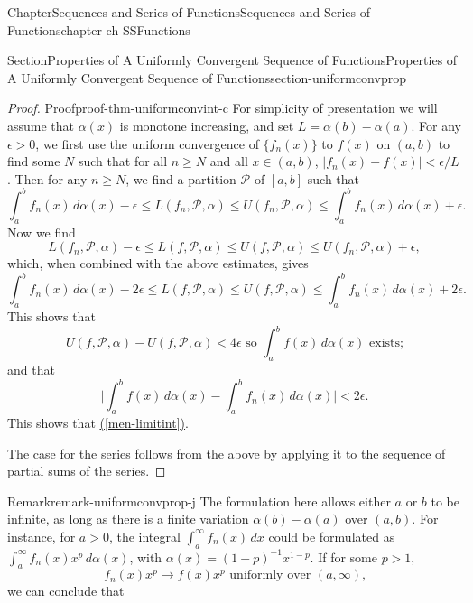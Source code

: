\documentclass[oneside,10pt,]{book}
\newcommand{\xreffont}{\relax}
\numberwithin{equation}{section}
\newcommand{\cP}{\mathcal{P}}
\newcommand{\lt}{<}
\newcommand{\gt}{>}
\begin{document}
\begin{chapterptx}{Chapter}{Sequences and Series of Functions}{}{Sequences and Series of Functions}{}{}{chapter-ch-SSFunctions}
\begin{sectionptx}{Section}{Properties of A Uniformly Convergent Sequence of Functions}{}{Properties of A Uniformly Convergent Sequence of Functions}{}{}{section-uniformconvprop}
\begin{proof}{Proof}{}{proof-thm-uniformconvint-c}
For simplicity of presentation we will assume that \(\alpha(x)\) is monotone increasing, and set \(L=\alpha(b)-\alpha(a)\). For any \(\epsilon \gt 0\), we first use the uniform convergence  of \(\{f_n(x)\}\) to \(f(x)\) on \((a, b)\) to find some \(N\) such that for all \(n\ge N\) and all \(x\in (a, b)\), \(\vert f_n(x)-f(x)\vert \lt \epsilon/L\). Then for any \(n\ge N\), we find a partition \(\cP\) of \([a, b]\) such that%
\begin{equation*}
\int_a^b f_n(x)\, d\alpha(x)-\epsilon \le L(f_n, \cP, \alpha) 
\le U(f_n, \cP, \alpha)\le 
\int_a^b f_n(x)\, d\alpha(x) +\epsilon.
\end{equation*}
Now we find%
\begin{equation*}
L(f_n, \cP, \alpha)-\epsilon \le L(f, \cP, \alpha)\le U(f, \cP, \alpha)\le U(f_n, \cP, \alpha)+\epsilon,
\end{equation*}
which, when combined with the above estimates, gives%
\begin{equation*}
\int_a^b f_n(x)\, d\alpha(x)-2\epsilon  \le L(f, \cP, \alpha)\le U(f, \cP, \alpha)\le
\int_a^b f_n(x)\, d\alpha(x) +2\epsilon.
\end{equation*}
This shows that%
\begin{equation*}
U(f, \cP, \alpha)-U(f, \cP, \alpha) \lt 4\epsilon \text{ so  $\int_a^b f(x)\, d\alpha(x)$ exists;}
\end{equation*}
and that%
\begin{equation*}
\vert \int_a^b f(x)\, d\alpha(x) - \int_a^b f_n(x)\, d\alpha(x)\vert \lt 2\epsilon.
\end{equation*}
This shows that \hyperref[men-limitint]{({\xreffont\ref{men-limitint}})}.%
\par
The case for the series follows from the above by applying it to the sequence of partial sums of the series.%
\end{proof}
\begin{remark}{Remark}{}{remark-uniformconvprop-j}%
The formulation here allows either \(a\) or \(b\) to be infinite, as long as there is a finite variation \(\alpha(b)-\alpha(a)\) over \((a, b)\).  For instance, for \(a\gt 0\), the integral \(\int_a^{\infty}f_n(x)\, dx\) could be formulated as \(\int_a^{\infty}f_n(x)x^p\, d\alpha(x)\), with \(\alpha(x)=(1-p)^{-1}x^{1-p}\). If  for some \(p\gt 1\),%
\begin{equation}
f_n(x)x^p\to f(x)x^p \text{ uniformly over $(a, \infty)$}\text{,}\label{men-wuc}
\end{equation}
we can conclude that%
\begin{equation*}

\end{equation*}
\end{remark}
\end{sectionptx}
\end{chapterptx}
\end{document}
